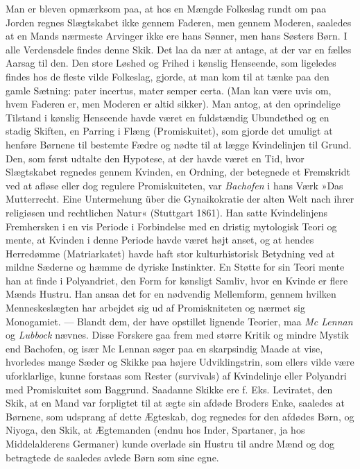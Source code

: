 \documentclass[12pt,a4paper,openany]{book}
\newcommand{\opage}[1]{\marginnote{\footnotesize\textit{[#1]}}}
\begin{document}
Man er bleven opmærksom paa, at hos en Mængde Folkeslag
rundt om paa Jorden regnes Slægtskabet ikke gennem Faderen,
men gennem Moderen, saaledes at en Mands nærmeste Arvinger
ikke ere hans Sønner, men hans Søsters Børn. I alle Verdensdele
findes denne Skik. Det laa da nær at antage, at der var en
fælles Aarsag til den. Den store Løshed og Frihed i kønslig
Henseende, som ligeledes findes hos de fleste vilde Folkeslag,
gjorde, at man kom til at tænke paa den gamle Sætning: pater
incertus, mater semper certa. (Man kan være uvis om, hvem
Faderen er, men Moderen er altid sikker). Man antog, at den
oprindelige Tilstand i kønslig Henseende havde været en fuldstændig
Ubundethed og en stadig Skiften, en Parring i Flæng
(Promiskuitet), som gjorde det umuligt at henføre Børnene til
bestemte Fædre og nødte til at lægge Kvindelinjen til Grund.
\opage{789}Den, som først udtalte den Hypotese, at der havde været en Tid,
hvor Slægtskabet regnedes gennem Kvinden, en Ordning, der betegnede
et Fremskridt ved at afløse eller dog regulere Promiskuiteten,
var \emph{Bachofen} i hans Værk »Das Mutterrecht. Eine
Untermehung über die Gynaikokratie der alten Welt nach ihrer
religiøsen und rechtlichen Natur« (Stuttgart 1861). Han satte
Kvindelinjens Fremhersken i en vis Periode i Forbindelse med
en dristig mytologisk Teori og mente, at Kvinden i denne Periode
havde været højt anset, og at hendes Herredømme (Matriarkatet)
havde haft stor kulturhistorisk Betydning ved at mildne Sæderne
og hæmme de dyriske Instinkter. En Støtte for sin Teori mente
han at finde i Polyandriet, den Form for kønsligt Samliv, hvor
en Kvinde er flere Mænds Hustru. Han ansaa det for en nødvendig
Mellemform, gennem hvilken Menneskeslægten har arbejdet
sig ud af Promiskniteten og nærmet sig Monogamiet. — Blandt
dem, der have opstillet lignende Teorier, maa \emph{Mc Lennan} og
\emph{Lubbock} nævnes. Disse Forskere gaa frem med større Kritik
og mindre Mystik end Bachofen, og især Mc Lennan søger paa
en skarpsindig Maade at vise, hvorledes mange Sæder og Skikke
paa højere Udviklingstrin, som ellers vilde være uforklarlige, kunne
forstaas som Rester (survivals) af Kvindelinje eller Polyandri med
Promiskuitet som Baggrund. Saadanne Skikke ere f. Eks. Leviratet,
den Skik, at en Mand var forpligtet til at ægte sin afdøde
Broders Enke, saaledes at Børnene, som udsprang af dette Ægteskab,
dog regnedes for den afdødes Børn, og Niyoga, den Skik,
at Ægtemanden (endnu hos Inder, Spartaner, ja hos Middelalderens
Germaner) kunde overlade sin Hustru til andre Mænd og dog
betragtede de saaledes avlede Børn som sine egne.
\end{document}
